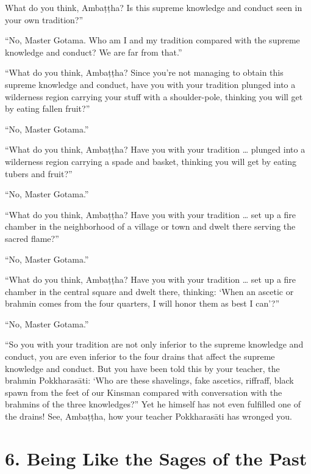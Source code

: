 \documentclass[12pt,openany]{book}%
\begin{document}
What do you think, \textsanskrit{Ambaṭṭha}? Is this supreme knowledge and conduct seen in your own tradition?” 

“No, Master Gotama. Who am I and my tradition compared with the supreme knowledge and conduct? We are far from that.” 

“What do you think, \textsanskrit{Ambaṭṭha}? Since you’re not managing to obtain this supreme knowledge and conduct, have you with your tradition plunged into a wilderness region carrying your stuff with a shoulder-pole, thinking you will get by eating fallen fruit?” 

“No, Master Gotama.” 

“What do you think, \textsanskrit{Ambaṭṭha}? Have you with your tradition … plunged into a wilderness region carrying a spade and basket, thinking you will get by eating tubers and fruit?” 

“No, Master Gotama.” 

“What do you think, \textsanskrit{Ambaṭṭha}? Have you with your tradition … set up a fire chamber in the neighborhood of a village or town and dwelt there serving the sacred flame?” 

“No, Master Gotama.” 

“What do you think, \textsanskrit{Ambaṭṭha}? Have you with your tradition … set up a fire chamber in the central square and dwelt there, thinking: ‘When an ascetic or brahmin comes from the four quarters, I will honor them as best I can’?” 

“No, Master Gotama.” 

“So you with your tradition are not only inferior to the supreme knowledge and conduct, you are even inferior to the four drains that affect the supreme knowledge and conduct. But you have been told this by your teacher, the brahmin \textsanskrit{Pokkharasāti}: ‘Who are these shavelings, fake ascetics, riffraff, black spawn from the feet of our Kinsman compared with conversation with the brahmins of the three knowledges?” Yet he himself has not even fulfilled one of the drains! See, \textsanskrit{Ambaṭṭha}, how your teacher \textsanskrit{Pokkharasāti} has wronged you. 

\section*{6. Being Like the Sages of the Past }
\end{document}
